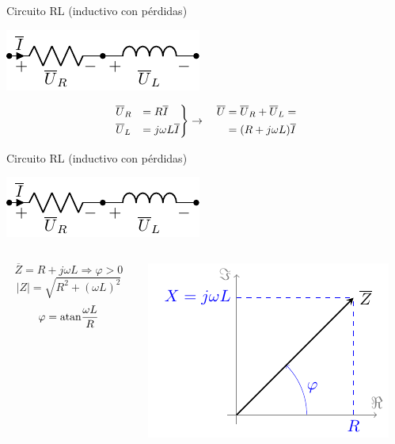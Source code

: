 \documentclass[aspectratio=169, usenames,svgnames,dvipsnames]{beamer}
\begin{document}
\begin{frame}[label={sec:orgbd4a45d}]{Circuito RL (inductivo con pérdidas)}
\begin{center}
\includegraphics[height=0.2\textheight]{../figs/RL.pdf}
\end{center}

\[
\begin{rcases}
  \overline{U}_R &= R \overline{I}\\
  \overline{U}_L &= j\omega L \overline{I}
\end{rcases} \rightarrow \quad
    \begin{aligned}
      \overline{U} &= \overline{U}_R + \overline{U}_L =\\
		   &=(R + j\omega L) \overline{I}
    \end{aligned}
\]
\end{frame}
\begin{frame}[label={sec:org5e3bf38}]{Circuito RL (inductivo con pérdidas)}
\begin{center}
\includegraphics[height=0.2\textheight]{../figs/RL.pdf}
\end{center}

\begin{columns}
\begin{column}{0.45\columnwidth}
\[
\overline{Z} = R + j\omega L \Rightarrow \boxed{\varphi > 0}
\]
\[
  |Z| = \sqrt{R^2 + (\omega L)^2}
\]
\[
  \varphi = \mathrm{atan}{\dfrac{\omega L}{R}}
\]
\end{column}

\begin{column}{0.55\columnwidth}
\begin{center}
\includegraphics[width=.9\linewidth]{../figs/fasorInductanciaReal.pdf}
\end{center}
\end{column}
\end{columns}
\end{frame}
\end{document}
